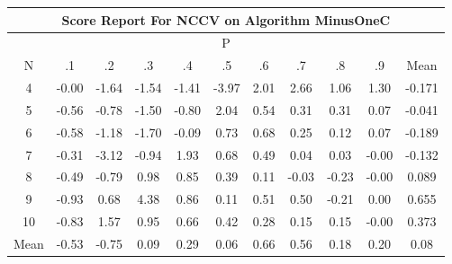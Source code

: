 \documentclass[11pt,a4paper]{report}
\begin{document}
\begin{longtable}{ | c || c | c | c | c | c | c | c | c | c || c |}
\hline
\multicolumn{11}{|c|}{ Score Report For NCCV on Algorithm MinusOneC} \\
\hline
\multicolumn{11}{|c|}{ P } \\
\hline
N & .1 & .2 & .3 & .4 & .5 & .6 & .7 & .8 & .9 & Mean\\
 \hline
 \hline
 \endhead
  4 &  \cellcolor[HTML]{FFFFFF} -0.00 &  \cellcolor[HTML]{FFD7D7} -1.64 &  \cellcolor[HTML]{FFD7D7} -1.54 &  \cellcolor[HTML]{FFDFDF} -1.41 &  \cellcolor[HTML]{FF9797} -3.97 &  \cellcolor[HTML]{CFCFFF} 2.01 &  \cellcolor[HTML]{BFBFFF} 2.66 &  \cellcolor[HTML]{E7E7FF} 1.06 &  \cellcolor[HTML]{DFDFFF} 1.30 & -0.171 \\
  5 &  \cellcolor[HTML]{FFEFEF} -0.56 &  \cellcolor[HTML]{FFEFEF} -0.78 &  \cellcolor[HTML]{FFD7D7} -1.50 &  \cellcolor[HTML]{FFE7E7} -0.80 &  \cellcolor[HTML]{CFCFFF} 2.04 &  \cellcolor[HTML]{EFEFFF} 0.54 &  \cellcolor[HTML]{F7F7FF} 0.31 &  \cellcolor[HTML]{F7F7FF} 0.31 &  \cellcolor[HTML]{FFFFFF} 0.07 & -0.041 \\
  6 &  \cellcolor[HTML]{FFEFEF} -0.58 &  \cellcolor[HTML]{FFDFDF} -1.18 &  \cellcolor[HTML]{FFD7D7} -1.70 &  \cellcolor[HTML]{FFFFFF} -0.09 &  \cellcolor[HTML]{EFEFFF} 0.73 &  \cellcolor[HTML]{EFEFFF} 0.68 &  \cellcolor[HTML]{F7F7FF} 0.25 &  \cellcolor[HTML]{FFFFFF} 0.12 &  \cellcolor[HTML]{FFFFFF} 0.07 & -0.189 \\
  7 &  \cellcolor[HTML]{FFF7F7} -0.31 &  \cellcolor[HTML]{FFAFAF} -3.12 &  \cellcolor[HTML]{FFE7E7} -0.94 &  \cellcolor[HTML]{CFCFFF} 1.93 &  \cellcolor[HTML]{EFEFFF} 0.68 &  \cellcolor[HTML]{EFEFFF} 0.49 &  \cellcolor[HTML]{FFFFFF} 0.04 &  \cellcolor[HTML]{FFFFFF} 0.03 &  \cellcolor[HTML]{FFFFFF} -0.00 & -0.132 \\
  8 &  \cellcolor[HTML]{FFEFEF} -0.49 &  \cellcolor[HTML]{FFEFEF} -0.79 &  \cellcolor[HTML]{E7E7FF} 0.98 &  \cellcolor[HTML]{E7E7FF} 0.85 &  \cellcolor[HTML]{F7F7FF} 0.39 &  \cellcolor[HTML]{FFFFFF} 0.11 &  \cellcolor[HTML]{FFFFFF} -0.03 &  \cellcolor[HTML]{FFF7F7} -0.23 &  \cellcolor[HTML]{FFFFFF} -0.00 & 0.089 \\
  9 &  \cellcolor[HTML]{FFE7E7} -0.93 &  \cellcolor[HTML]{EFEFFF} 0.68 &  \cellcolor[HTML]{8F8FFF} 4.38 &  \cellcolor[HTML]{E7E7FF} 0.86 &  \cellcolor[HTML]{FFFFFF} 0.11 &  \cellcolor[HTML]{EFEFFF} 0.51 &  \cellcolor[HTML]{EFEFFF} 0.50 &  \cellcolor[HTML]{FFF7F7} -0.21 &  \cellcolor[HTML]{FFFFFF} 0.00 & 0.655 \\
  10 &  \cellcolor[HTML]{FFE7E7} -0.83 &  \cellcolor[HTML]{D7D7FF} 1.57 &  \cellcolor[HTML]{E7E7FF} 0.95 &  \cellcolor[HTML]{EFEFFF} 0.66 &  \cellcolor[HTML]{F7F7FF} 0.42 &  \cellcolor[HTML]{F7F7FF} 0.28 &  \cellcolor[HTML]{FFFFFF} 0.15 &  \cellcolor[HTML]{FFFFFF} 0.15 &  \cellcolor[HTML]{FFFFFF} -0.00 & 0.373 \\
 \hline
 \hline
Mean &  \cellcolor[HTML]{FFEFEF} -0.53 &  \cellcolor[HTML]{FFEFEF} -0.75 &  \cellcolor[HTML]{FFFFFF} 0.09 &  \cellcolor[HTML]{F7F7FF} 0.29 &  \cellcolor[HTML]{FFFFFF} 0.06 &  \cellcolor[HTML]{EFEFFF} 0.66 &  \cellcolor[HTML]{EFEFFF} 0.56 &  \cellcolor[HTML]{F7F7FF} 0.18 &  \cellcolor[HTML]{F7F7FF} 0.20 &  \cellcolor[HTML]{FFFFFF} 0.08
\end{longtable}
\end{document}
